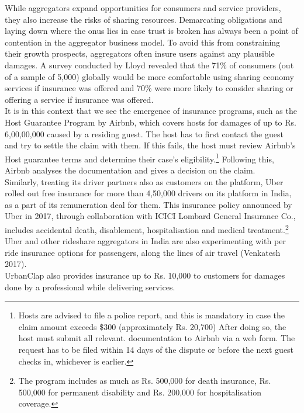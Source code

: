 \documentclass[a4paper, 12pt]{article}
\begin{document}
While aggregators expand opportunities for consumers and service providers, they also increase the risks of sharing resources. Demarcating obligations and laying down where the onus lies in case trust is broken has always been a point of contention in the aggregator business model. To avoid this from constraining their growth prospects, aggregators often insure users against any plausible damages. A survey conducted by Lloyd revealed that the 71\% of consumers (out of a sample of 5,000) globally would be more comfortable using sharing economy services if insurance was offered and 70\% were more likely to consider sharing or offering a service if insurance was offered. \\

It is in this context that we see the emergence of insurance programs, such as the Host Guarantee Program by Airbnb, which covers hosts for damages of up to Rs. 6,00,00,000 caused by a residing guest. The host has to first contact the guest and try to settle the claim with them. If this fails, the host must review Airbnb's Host guarantee terms and determine their case’s eligibility.\footnote {Hosts are advised to file a police report, and this is mandatory in case the claim amount exceeds \$300 (approximately Rs. 20,700) After doing so, the host must submit all relevant. documentation to Airbnb via a web form. The request has to be filed within 14 days of the dispute or before the next guest checks in, whichever is earlier.} Following this, Airbnb analyses the documentation and gives a decision on the claim. \\

Similarly, treating its driver partners also as customers on the platform, Uber rolled out free insurance for more than 4,50,000 drivers on its platform in India, as a part of its remuneration deal for them. This insurance policy announced by Uber in 2017, through collaboration with ICICI Lombard General Insurance Co., includes accidental death, disablement, hospitalisation and medical treatment.\footnote{The program includes as much as Rs. 500,000 for death insurance, Rs. 500,000 for permanent disability and Rs. 200,000 for hospitalisation coverage.}  Uber and other rideshare aggregators in India are also experimenting with per ride insurance options for passengers, along the lines of air travel (Venkatesh 2017). \\
                    
                    UrbanClap also provides insurance up to Rs. 10,000 to customers for damages done by a professional while delivering services. \\
\end{document}

